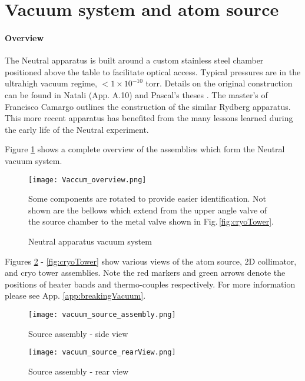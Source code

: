 \pagebreak
\section{Vacuum system and atom source} \label{sec:vac}
\setcounter{footnote}{0}
\paragraph{Overview}
	
The Neutral apparatus is built around a custom stainless steel chamber positioned above the table to facilitate optical access. Typical pressures are in the ultrahigh vacuum regime, $<1\times10^{-10}$ torr. 
Details on the original construction can be found in Natali (App. A.10) and Pascal's theses \cite{MartinezdeEscolar2010,Mickelson2010b}. The master's of Francisco Camargo \cite{Camargo2015} outlines the construction of the similar Rydberg apparatus. This more recent apparatus has benefited from the many lessons learned during the early life of the Neutral experiment.

Figure \ref{fig:vacuumSystem} shows a complete overview of the assemblies which form the Neutral vacuum system.
	\begin{figure} 
		\centerline{
		\texttt{[image: Vaccum\_overview.png]}}
		\caption{Neutral apparatus vacuum system}{Some components are rotated to provide easier identification. Not shown are the bellows which extend from the upper angle valve of the source chamber to the metal valve shown in Fig.\,\ref{fig:cryoTower}.}
		\label{fig:vacuumSystem}
	\end{figure}		
Figures \ref{fig:sourceSideView} - \ref{fig:cryoTower} show various views of the atom source, 2D collimator, and cryo tower assemblies. Note the red markers and green arrows denote the positions of heater bands and thermo-couples respectively. For more information please see App. \ref{app:breakingVacuum}.
	\begin{figure} 
		\centerline{
		\texttt{[image: vacuum\_source\_assembly.png]}}
		\caption{Source assembly - side view}
		\label{fig:sourceSideView}
	\end{figure}
	
	\begin{figure} 
		\centerline{
		\texttt{[image: vacuum\_source\_rearView.png]}}
		\caption{Source assembly - rear view}
		\label{fig:sourceRearView}
	\end{figure}
	
